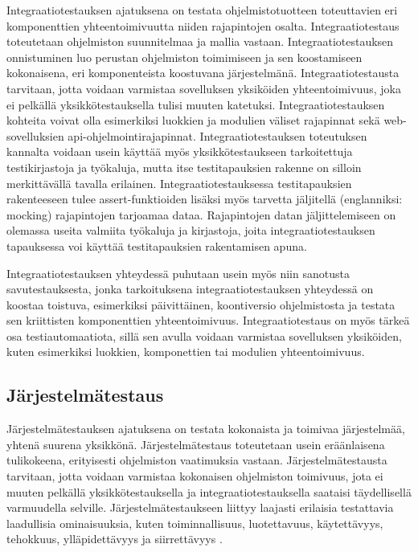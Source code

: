   Integraatiotestauksen ajatuksena on testata ohjelmistotuotteen toteuttavien eri komponenttien yhteentoimivuutta niiden rajapintojen osalta.
  Integraatiotestaus toteutetaan ohjelmiston suunnitelmaa ja mallia vastaan.
  Integraatiotestauksen onnistuminen luo perustan ohjelmiston toimimiseen ja sen  koostamiseen kokonaisena, eri komponenteista koostuvana järjestelmänä.
  Integraatiotestausta tarvitaan, jotta voidaan varmistaa sovelluksen yksiköiden yhteentoimivuus, joka ei pelkällä yksikkötestauksella tulisi muuten katetuksi.
  Integraatiotestauksen kohteita voivat olla esimerkiksi luokkien ja modulien väliset rajapinnat sekä web-sovelluksien api-ohjelmointirajapinnat.
  Integraatiotestauksen toteutuksen kannalta voidaan usein käyttää myös yksikkötestaukseen tarkoitettuja testikirjastoja ja työkaluja, mutta itse testitapauksien rakenne on silloin merkittävällä tavalla erilainen.
  Integraatiotestauksessa testitapauksien rakenteeseen tulee assert-funktioiden lisäksi myös tarvetta jäljitellä (englanniksi: mocking) rajapintojen tarjoamaa dataa.
  Rajapintojen datan jäljittelemiseen on olemassa useita valmiita työkaluja ja kirjastoja, joita integraatiotestauksen tapauksessa voi käyttää testitapauksien rakentamisen apuna.

  Integraatiotestauksen yhteydessä puhutaan usein myös niin sanotusta savutestauksesta, jonka tarkoituksena integraatiotestauksen yhteydessä on koostaa toistuva, esimerkiksi päivittäinen, koontiversio ohjelmistosta ja testata sen kriittisten komponenttien yhteentoimivuus.
  Integraatiotestaus on myös tärkeä osa testiautomaatiota, sillä sen avulla voidaan varmistaa sovelluksen yksiköiden, kuten esimerkiksi luokkien, komponettien tai modulien yhteentoimivuus.

  \subsection{Järjestelmätestaus} \label{ch:07_jarjestelmatestaus}

  Järjestelmätestauksen ajatuksena on testata kokonaista ja toimivaa järjestelmää, yhtenä suurena yksikkönä.
  Järjestelmätestaus toteutetaan usein eräänlaisena tulikokeena, erityisesti ohjelmiston vaatimuksia vastaan.
  Järjestelmätestausta tarvitaan, jotta voidaan varmistaa kokonaisen ohjelmiston toimivuus, jota ei muuten pelkällä yksikkötestauksella ja integraatiotestauksella saataisi täydellisellä varmuudella selville.
  Järjestelmätestaukseen liittyy laajasti erilaisia testattavia laadullisia ominaisuuksia, kuten toiminnallisuus, luotettavuus, käytettävyys, tehokkuus, ylläpidettävyys ja siirrettävyys \parencite{iso_9126-1_2001}.

